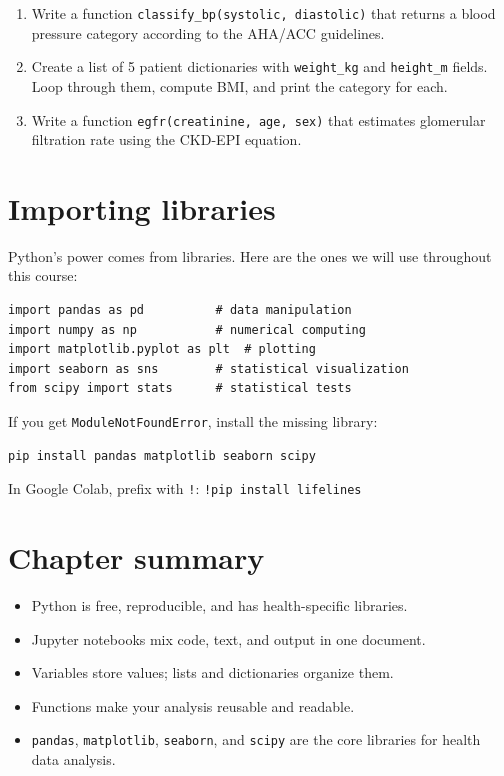 \begin{exercise}
\begin{enumerate}
  \item Write a function \texttt{classify\_bp(systolic, diastolic)} that returns a blood pressure category according to the AHA/ACC guidelines.
  \item Create a list of 5 patient dictionaries with \texttt{weight\_kg} and \texttt{height\_m} fields. Loop through them, compute BMI, and print the category for each.
  \item Write a function \texttt{egfr(creatinine, age, sex)} that estimates glomerular filtration rate using the CKD-EPI equation.
\end{enumerate}
\end{exercise}

\section{Importing libraries}

Python's power comes from libraries. Here are the ones we will use throughout this course:

\begin{verbatim}
import pandas as pd          # data manipulation
import numpy as np           # numerical computing
import matplotlib.pyplot as plt  # plotting
import seaborn as sns        # statistical visualization
from scipy import stats      # statistical tests
\end{verbatim}

\begin{warningbox}
If you get \texttt{ModuleNotFoundError}, install the missing library:
\begin{verbatim}
pip install pandas matplotlib seaborn scipy
\end{verbatim}
In Google Colab, prefix with \texttt{!}: \texttt{!pip install lifelines}
\end{warningbox}

\section{Chapter summary}

\begin{itemize}
  \item Python is free, reproducible, and has health-specific libraries.
  \item Jupyter notebooks mix code, text, and output in one document.
  \item Variables store values; lists and dictionaries organize them.
  \item Functions make your analysis reusable and readable.
  \item \texttt{pandas}, \texttt{matplotlib}, \texttt{seaborn}, and \texttt{scipy} are the core libraries for health data analysis.
\end{itemize}
